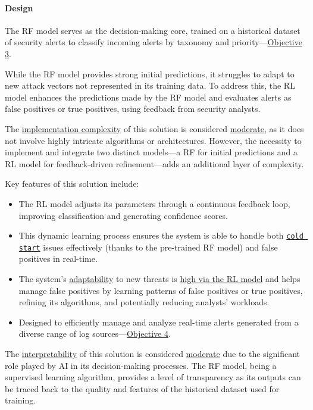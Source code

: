 \paragraph{Design} 

The RF model serves as the decision-making core, trained on a historical dataset of security alerts to classify incoming alerts by taxonomy and priority—\hyperref[objective3]{Objective 3}.

While the RF model provides strong initial predictions, it struggles to adapt to new attack vectors not represented in its training data. 
To address this, the RL model enhances the predictions made by the RF model and evaluates alerts as false positives or true positives, using feedback from security analysts.

The \underline{implementation complexity} of this solution is considered \underline{moderate}, as it does not involve highly intricate algorithms or architectures. 
However, the necessity to implement and integrate two distinct models—a RF for initial predictions and a RL model for feedback-driven refinement—adds an additional layer of complexity. 

Key features of this solution include:
\begin{itemize}
    \item The RL model adjusts its parameters through a continuous feedback loop, improving classification and generating confidence scores.
    \item This dynamic learning process ensures the system is able to handle both \underline{\texttt{cold start}} issues effectively (thanks to the pre-trained RF model) and false positives in real-time.
    \item The system's \underline{adaptability} to new threats is \underline{high via the RL model} and helps manage false positives by learning patterns of false positives or true positives, refining its algorithms, and potentially reducing analysts' workloads.
    \item Designed to efficiently manage and analyze real-time alerts generated from a diverse range of log sources—\hyperref[objective4]{Objective 4}.
\end{itemize}

The \underline{interpretability} of this solution is considered \underline{moderate} due to the significant role played by AI in its decision-making processes. 
The RF model, being a supervised learning algorithm, provides a level of transparency as its outputs can be traced back to the quality and features of the historical dataset used for training. 

